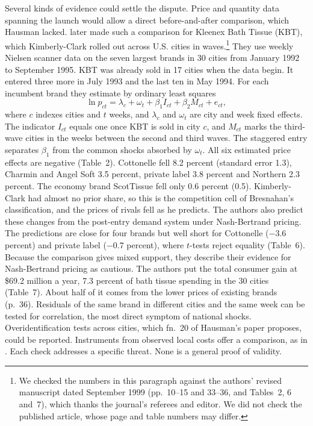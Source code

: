 Several kinds of evidence could settle the dispute. Price and quantity data spanning the launch would allow
a direct before-and-after comparison, which Hausman lacked. \citet{HausmanLeonard2002} later made such a
comparison for Kleenex Bath Tissue (KBT), which Kimberly-Clark rolled out across U.S. cities in waves.\footnote{We
checked the numbers in this paragraph against the authors' revised manuscript dated September 1999 (pp.~10--15 and
33--36, and Tables~2, 6 and~7), which thanks the journal's referees and editor. We did not check the published article, whose
page and table numbers may differ.}
They use weekly Nielsen scanner data on the seven largest brands in 30 cities from January 1992 to September 1995.
KBT was already sold in 17 cities when the data begin. It entered three more in July 1993 and the last ten in May
1994. For each incumbent brand they estimate by ordinary least squares
\begin{equation}\label{eq:10-hl-direct}
  \ln p_{ct} = \lambda_c + \omega_t + \beta_1 I_{ct} + \beta_2 M_{ct} + e_{ct},
\end{equation}
where $c$ indexes cities and $t$ weeks, and $\lambda_c$ and $\omega_t$ are city and week fixed effects. The
indicator $I_{ct}$ equals one once KBT is sold in city $c$, and $M_{ct}$ marks the third-wave cities in the weeks
between the second and third waves. The staggered entry separates $\beta_1$ from the common shocks absorbed by
$\omega_t$. All six estimated price effects are negative (Table~2). Cottonelle fell 8.2 percent (standard error
1.3), Charmin and Angel Soft 3.5 percent, private label 3.8 percent and Northern 2.3 percent. The economy brand
ScotTissue fell only 0.6 percent (0.5). Kimberly-Clark had almost no prior share, so this is the competition cell
of Bresnahan's classification, and the prices of rivals fell as he predicts. The authors also predict these
changes from the post-entry demand system under Nash-Bertrand pricing. The predictions are close for four brands
but well short for Cottonelle ($-3.6$ percent) and private label ($-0.7$ percent), where $t$-tests reject equality
(Table~6). Because the comparison gives mixed support, they describe their evidence for Nash-Bertrand pricing as
cautious. The authors put the total consumer
gain at \$69.2 million a year, 7.3 percent of bath tissue spending in the 30 cities (Table~7). About half of it
comes from the lower prices of existing brands (p.~36).
Residuals of the same brand in different cities and the same week can be tested for correlation, the most
direct symptom of national shocks. Overidentification tests across cities, which fn.~20 of Hausman's paper
proposes, could be reported. Instruments from observed local costs offer a comparison, as in
\citet{Nevo2001}. Each check addresses a specific threat. None is a general proof of validity.


